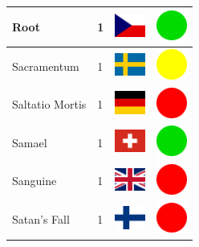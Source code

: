 \documentclass[12pt, a4paper, twoside]{report}
\begin{document}
\begin{center}
\begin{longtable}{|p{5cm}|p{2cm}|p{2cm}|p{2cm}|}
			Root & 1 & \includegraphics[width=1cm]{4x3/cz} & \includegraphics[width=1cm]{likes/y} \\ \hline
			Sacramentum﻿ & 1 & \includegraphics[width=1cm]{4x3/se} & \includegraphics[width=1cm]{likes/m} \\ \hline
			Saltatio Mortis & 1 & \includegraphics[width=1cm]{4x3/de} & \includegraphics[width=1cm]{likes/n} \\ \hline
			Samael & 1 & \includegraphics[width=1cm]{4x3/ch} & \includegraphics[width=1cm]{likes/y} \\ \hline
			Sanguine & 1 & \includegraphics[width=1cm]{4x3/gb} & \includegraphics[width=1cm]{likes/n} \\ \hline
			Satan's Fall & 1 & \includegraphics[width=1cm]{4x3/fi} & \includegraphics[width=1cm]{likes/n} \\ \hline

\end{longtable}
\end{center}
\end{document}
